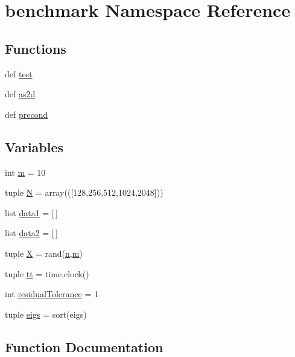 \hypertarget{namespacebenchmark}{}\section{benchmark Namespace Reference}
\label{namespacebenchmark}
\subsection*{Functions}
\begin{DoxyCompactItemize}
\item 
def \hyperlink{namespacebenchmark_a1bffaebdeea9ce5d705ccb8322d3c09d}{test}
\item 
def \hyperlink{namespacebenchmark_a6d189a799d73b01a4a2fea0f5ae44de6}{as2d}
\item 
def \hyperlink{namespacebenchmark_a92e492ce2baed712289e5b8afcda50d0}{precond}
\end{DoxyCompactItemize}
\subsection*{Variables}
\begin{DoxyCompactItemize}
\item 
int \hyperlink{namespacebenchmark_a16506035ffd4e4ce6c78ecec25a33371}{m} = 10
\item 
tuple \hyperlink{namespacebenchmark_a12396bf40f6310f099fa1103ab4df652}{N} = array((\mbox{[}128,256,512,1024,2048\mbox{]}))
\item 
list \hyperlink{namespacebenchmark_a96dc550e6db77d20973106a1eac7e913}{data1} = \mbox{[}$\,$\mbox{]}
\item 
list \hyperlink{namespacebenchmark_a6643d327aa102a8e13e3fc908d9be2fb}{data2} = \mbox{[}$\,$\mbox{]}
\item 
tuple \hyperlink{namespacebenchmark_ab33f3cd45ad909f26396e4aec122313b}{X} = rand(\hyperlink{indexexpr_8h_ab427e2e2b4d6cec55fa088ea2a692ace}{n},\hyperlink{namespacebenchmark_a16506035ffd4e4ce6c78ecec25a33371}{m})
\item 
tuple \hyperlink{namespacebenchmark_afb838c51535e5b774247ae475c6021f3}{tt} = time.\+clock()
\item 
int \hyperlink{namespacebenchmark_a4a9bbdb7a7ae217b5e9771fd0205b960}{residual\+Tolerance} = 1
\item 
tuple \hyperlink{namespacebenchmark_aef18ca54e5c510329532062a6051da43}{eigs} = sort(eigs)
\end{DoxyCompactItemize}


\subsection{Function Documentation}
\hypertarget{namespacebenchmark_a6d189a799d73b01a4a2fea0f5ae44de6}{}

